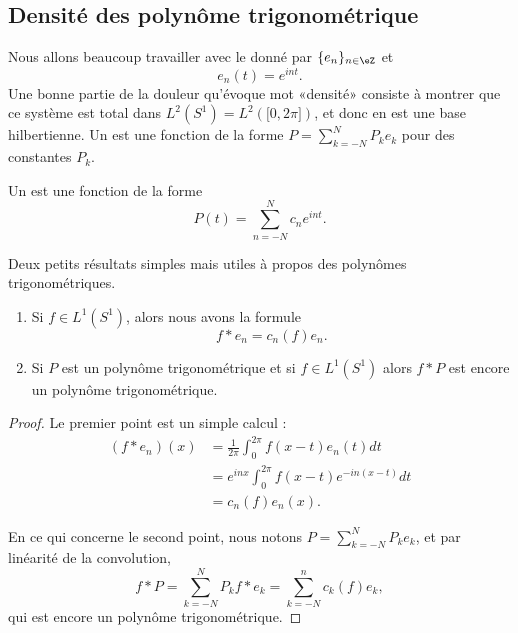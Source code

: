 \subsection{Densité des polynôme trigonométrique}

Nous allons beaucoup travailler avec le  donné par \( \{ e_n \}_{n\in \eZ}\) et
\begin{equation}
    e_n(t)= e^{int}.
\end{equation}
Une bonne partie de la douleur qu'évoque mot «densité» consiste à montrer que ce système est total dans \( L^2(S^1)=L^2(\mathopen[ 0 , 2\pi \mathclose])\), et donc en est une base hilbertienne. Un  est une fonction de la forme \( P=\sum_{k=-N}^NP_ke_k\) pour des constantes \( P_k\).

Un  est une fonction de la forme
\begin{equation}
    P(t)=\sum_{n=-N}^Nc_n e^{int}.
\end{equation}

\begin{lemma}   \label{LemZVfZlms}
    Deux petits résultats simples mais utiles à propos des polynômes trigonométriques.
    \begin{enumerate}
        \item
    Si \( f\in L^1(S^1)\), alors nous avons la formule
    \begin{equation}
        f*e_n=c_n(f)e_n.
    \end{equation}
\item
            
    Si \( P\) est un polynôme trigonométrique et si \( f\in L^1(S^1)\) alors \( f*P\) est encore un polynôme trigonométrique.
    \end{enumerate}
\end{lemma}

\begin{proof}
    Le premier point est un simple calcul :
    \begin{subequations}
        \begin{align}
            (f*e_n)(x)&=\frac{1}{ 2\pi }\int_0^{2\pi}f(x-t)e_n(t)dt\\
            &= e^{inx}\int_0^{2\pi}f(x-t) e^{-in(x-t)}dt\\
            &=c_n(f)e_n(x).
        \end{align}
    \end{subequations}

    En ce qui concerne le second point, nous notons \( P=\sum_{k=-N}^NP_ke_k\), et par linéarité de la convolution,
    \begin{equation}
        f*P=\sum_{k=-N}^NP_kf*e_k=\sum_{k=-N}^nc_k(f)e_k,
    \end{equation}
    qui est encore un polynôme trigonométrique.
\end{proof}

